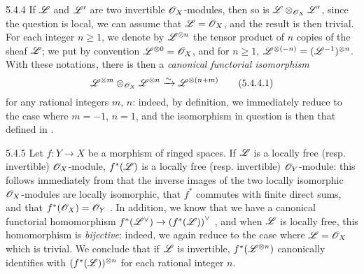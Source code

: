 \begin{env}{5.4.4}
\label{env-0.5.4.4}
If $\mathscr{L}$ and $\mathscr{L}'$ are two invertible $\mathscr{O}_X$-modules, then so is
$\mathscr{L}\otimes_{\mathscr{O}_X}\mathscr{L}'$, since the question is local, we can assume that
$\mathscr{L}=\mathscr{O}_X$, and the result is then trivial. For each integer $n\geqslant 1$, we denote by
$\mathscr{L}^{\otimes n}$ the tensor product of $n$ copies of the sheaf
$\mathscr{L}$; we put by convention $\mathscr{L}^{\otimes 0}=\mathscr{O}_X$, and for $n\geqslant 1$,
$\mathscr{L}^{\otimes(-n)}=(\mathscr{L}^{-1})^{\otimes n}$. With these notations, there is then a
\emph{canonical functorial isomorphism}
\[
  \mathscr{L}^{\otimes m}\otimes_{\mathscr{O}_X}\mathscr{L}^{\otimes n}\xrightarrow{\sim}\mathscr{L}^{\otimes(n+m)}
  \tag{5.4.4.1}
\]
for any rational integers $m$, $n$: indeed, by definition, we immediately reduce to the
case where $m=-1$, $n=1$, and the isomorphism in question is then that defined in
.
\end{env}

\begin{env}{5.4.5}
\label{env-0.5.4.5}
Let $f:Y\to X$ be a morphism of ringed spaces. If $\mathscr{L}$ is a locally free
(resp. invertible) $\mathscr{O}_X$-module, $f^*(\mathscr{L})$ is a locally free (resp. invertible)
$\mathscr{O}_Y$-module: this follows immediately from that the inverse images of the two locally
isomorphic $\mathscr{O}_X$-modules are locally isomorphic, that $f^*$ commutes with finite direct
sums, and that $f^*(\mathscr{O}_X)=\mathscr{O}_Y$ . In addition, we know that we have a
canonical functorial homomorphism $f^*({\mathscr{L}}^\vee)\to{(f^*(\mathscr{L}))}^\vee$
, and when $\mathscr{L}$ is locally free, this homomorphism is \emph{bijective}:
indeed, we again reduce to the case where $\mathscr{L}=\mathscr{O}_X$ which is trivial. We conclude that
if $\mathscr{L}$ is invertible, $f^*(\mathscr{L}^{\otimes n})$ canonically identifies with
$(f^*(\mathscr{L}))^{\otimes n}$ for each rational integer $n$.
\end{env}

